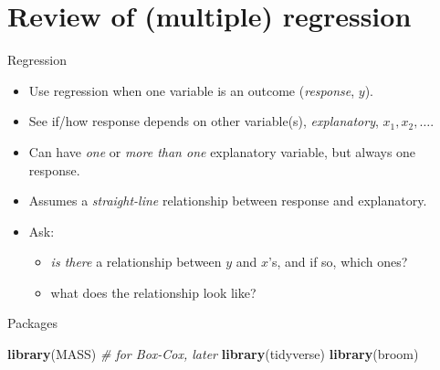 \documentclass[
  ignorenonframetext,
]{beamer}
\newenvironment{Shaded}{\begin{snugshade}}{\end{snugshade}}
\newcommand{\CommentTok}[1]{\textcolor[rgb]{0.56,0.35,0.01}{\textit{#1}}}
\newcommand{\KeywordTok}[1]{\textcolor[rgb]{0.13,0.29,0.53}{\textbf{#1}}}
\newcommand{\NormalTok}[1]{#1}
\providecommand{\tightlist}{%
  \setlength{\itemsep}{0pt}\setlength{\parskip}{0pt}}
\begin{document}
\hypertarget{review-of-multiple-regression}{%
\section{Review of (multiple)
regression}\label{review-of-multiple-regression}}

\begin{frame}{Regression}
\protect\hypertarget{regression}{}

\begin{itemize}
\item
  Use regression when one variable is an outcome (\emph{response},
  \(y\)).
\item
  See if/how response depends on other variable(s), \emph{explanatory},
  \(x_1, x_2,\ldots\).
\item
  Can have \emph{one} or \emph{more than one} explanatory variable, but
  always one response.
\item
  Assumes a \emph{straight-line} relationship between response and
  explanatory.
\item
  Ask:

  \begin{itemize}
  \tightlist
  \item
    \emph{is there} a relationship between \(y\) and \(x\)'s, and if so,
    which ones?
  \item
    what does the relationship look like?
  \end{itemize}
\end{itemize}

\end{frame}

\begin{frame}[fragile]{Packages}
\protect\hypertarget{packages}{}

\begin{Shaded}
\begin{Highlighting}[]
\KeywordTok{library}\NormalTok{(MASS) }\CommentTok{# for Box-Cox, later}
\KeywordTok{library}\NormalTok{(tidyverse)}
\KeywordTok{library}\NormalTok{(broom)}
\end{Highlighting}
\end{Shaded}

\end{frame}
\end{document}
